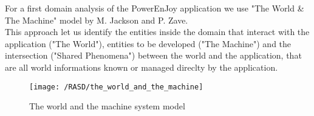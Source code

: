 For a first domain analysis of the PowerEnJoy application we use "The World \& The Machine" model by M. Jackson and P. Zave. 
\\This approach let us identify the entities inside the domain that interact with the application ("The World"), entities to be developed ("The Machine") and the intersection ("Shared Phenomena") between the world and the application, that are all world informations known or managed direclty by the application.
\begin{figure}[!ht]
  \centering
  \vspace{0.2cm}
  \texttt{[image: /RASD/the\_world\_and\_the\_machine]}\\ 
  \vspace{0.5cm}
  \caption{The world and the machine system model} \label{fig:the_world_and_the_machine} 
\end{figure}
